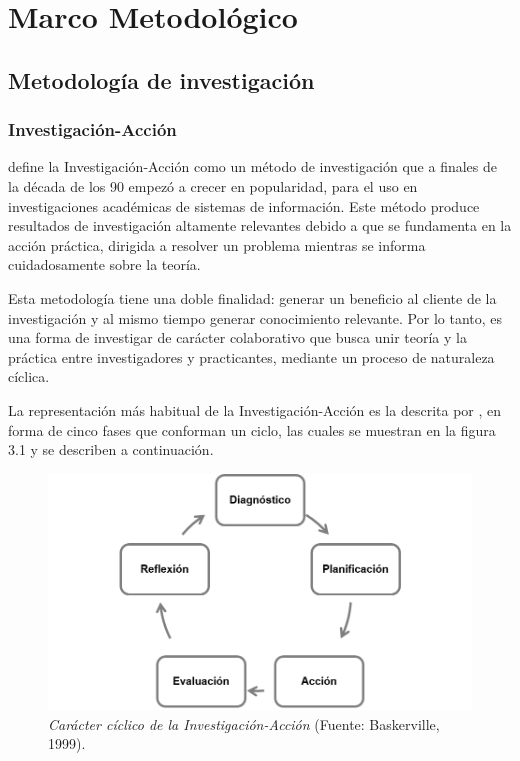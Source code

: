 \chapter{ Marco Metodol\'{o}gico}
	
	\section{Metodolog\'{i}a de investigaci\'{o}n}
	
		\subsection{Investigaci\'{o}n-Acci\'{o}n}
	 define la Investigaci\'{o}n-Acci\'{o}n como un m\'{e}todo de investigaci\'{o}n que a finales de la d\'{e}cada de los 90 empez\'{o} a crecer en popularidad, para el uso en investigaciones acad\'{e}micas de sistemas de informaci\'{o}n. Este m\'{e}todo produce resultados de investigaci\'{o}n altamente relevantes debido a que se fundamenta en la acci\'{o}n pr\'{a}ctica, dirigida a resolver un problema mientras se informa cuidadosamente sobre la teor\'{i}a.

	Esta metodolog\'{i}a tiene una doble finalidad: generar un beneficio al cliente de la investigaci\'{o}n y al mismo tiempo generar conocimiento relevante. Por lo tanto, es una forma de investigar de car\'{a}cter colaborativo que busca unir teor\'{i}a y la pr\'{a}ctica entre investigadores y practicantes, mediante un proceso de naturaleza c\'{i}clica.

	La representaci\'{o}n m\'{a}s habitual de la Investigaci\'{o}n-Acci\'{o}n es la descrita por , en forma de cinco fases que conforman un ciclo, las cuales se muestran en la figura 3.1 y se describen a continuaci\'{o}n.

	\begin{figure}
		\centering
		\includegraphics[scale=0.8]{img/investigacion-accion.png}
			\caption[Car\'{a}cter c\'{i}clico de la Investigaci\'{o}n-Acci\'{o}n]{\textit{Car\'{a}cter c\'{i}clico de la Investigaci\'{o}n-Acci\'{o}n} (Fuente: Baskerville, 1999).}
	\end{figure}

